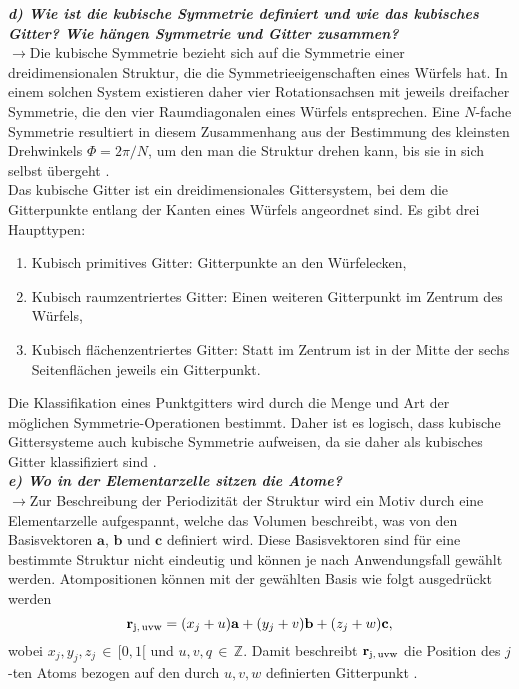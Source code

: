 \textbf{\textit{d) Wie ist die kubische Symmetrie definiert und wie das kubisches Gitter? 
Wie hängen Symmetrie und Gitter zusammen?}}\\
$\rightarrow$Die kubische Symmetrie bezieht sich auf die Symmetrie einer dreidimensionalen Struktur, 
die die Symmetrieeigenschaften eines Würfels hat. In einem solchen System existieren daher vier Rotationsachsen 
mit jeweils dreifacher Symmetrie, die den vier Raumdiagonalen eines Würfels entsprechen. Eine 
$N$-fache Symmetrie resultiert in diesem Zusammenhang aus der Bestimmung des kleinsten Drehwinkels $\Phi=2\pi/N$, 
um den man die Struktur drehen kann, bis sie in sich selbst übergeht \cite{EPC}. \\
Das kubische Gitter ist ein dreidimensionales Gittersystem, bei dem die Gitterpunkte entlang der 
Kanten eines Würfels angeordnet sind. Es gibt drei Haupttypen:
\begin{enumerate}
    \item Kubisch primitives Gitter: Gitterpunkte an den Würfelecken,
    \item Kubisch raumzentriertes Gitter: Einen weiteren Gitterpunkt im Zentrum des Würfels,
    \item Kubisch flächenzentriertes Gitter: Statt im Zentrum ist in der Mitte der sechs Seitenflächen jeweils ein Gitterpunkt.
\end{enumerate}
Die Klassifikation eines Punktgitters wird durch die Menge und Art der möglichen Symmetrie-Operationen bestimmt. 
Daher ist es logisch, dass kubische Gittersysteme auch kubische Symmetrie aufweisen, da sie daher als kubisches Gitter 
klassifiziert sind \cite{EPC}. \\

\textbf{\textit{e) Wo in der Elementarzelle sitzen die Atome?}}\\
$\rightarrow$Zur Beschreibung der Periodizität der Struktur wird ein Motiv durch eine Elementarzelle aufgespannt, welche 
das Volumen beschreibt, was von den Basisvektoren $\mathbf{a}$, $\mathbf{b}$ und $\mathbf{c}$ definiert wird. 
Diese Basisvektoren sind für eine bestimmte Struktur nicht eindeutig und können je nach Anwendungsfall gewählt werden. 
Atompositionen können mit der gewählten Basis wie folgt ausgedrückt werden
\begin{equation}\label{eq:position}
    \mathbf{r}_{\text{j,\,uvw}} = (x_{j} + u)\mathbf{a} + (y_{j} + v)\mathbf{b} + (z_{j} + w)\mathbf{c},
\end{equation} 
wobei $x_{j}, y_{j}, z_{j}\,\in\,[0,1[$ und $u,v,q\,\in\,\mathbb{Z}$. Damit beschreibt $\mathbf{r}_{\text{j,\,uvw}}$
die Position des $j$-ten Atoms bezogen auf den durch $u,v,w$ definierten Gitterpunkt \cite{Schwarz, EPC}.